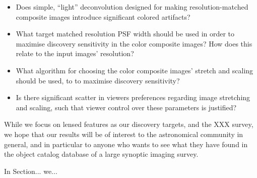 \documentclass[letterpaper, 11pt]{article}
\begin{document}
\begin{itemize}

\item Does simple, ``light'' deconvolution designed for making
resolution-matched composite images introduce significant colored artifacts?

\item What target matched resolution PSF width should be used in order to
maximise discovery sensitivity in the color composite images? How does this
relate to the input images' resolution?

\item What algorithm for choosing the color composite images' stretch and
scaling should be used, to to maximise discovery sensitivity? 

\item Is there significant scatter in viewers preferences regarding image
stretching and scaling, such that viewer control over these parameters is
justified?

\end{itemize}

While we focus on lensed features as our discovery targets, and the XXX
survey, we hope that our results will be of interest to the astronomical
community in general, and in particular to anyone who wants to see what they
have found in the object catalog database of a large synoptic imaging survey.

In Section... we...

\newpage


\end{document}
